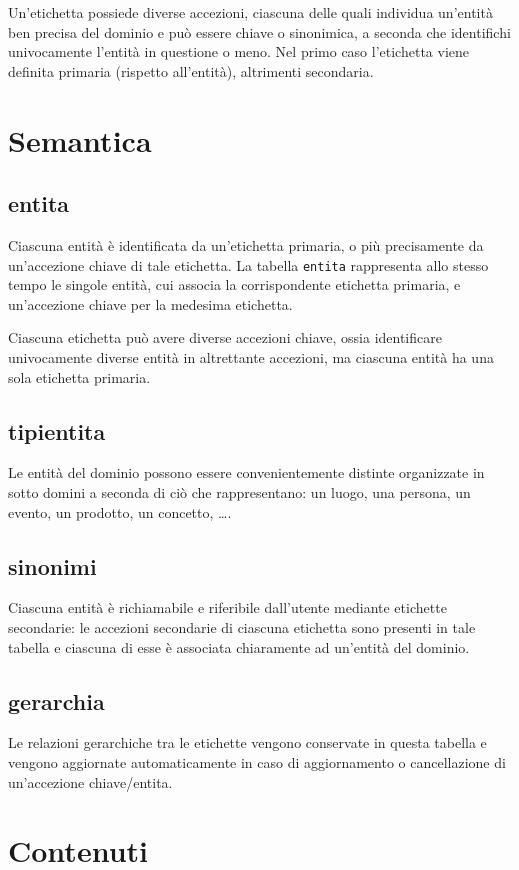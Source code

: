 \documentclass[10pt,a4paper,headinclude,footinclude,hidelinks]{scrreprt} %
\begin{document}
	Un'etichetta possiede diverse accezioni, ciascuna delle quali individua un'entità ben precisa del dominio e può essere chiave o sinonimica, a seconda che identifichi univocamente l'entità in questione o meno. Nel primo caso l'etichetta viene definita primaria (rispetto all'entità), altrimenti secondaria.
	
	\section{Semantica}
	\subsection{entita}
	Ciascuna entità è identificata da un'etichetta primaria, o più precisamente da un'accezione chiave di tale etichetta. La tabella \texttt{entita} rappresenta allo stesso tempo le singole entità, cui associa la corrispondente etichetta primaria, e un'accezione chiave per la medesima etichetta.

	Ciascuna etichetta può avere diverse accezioni chiave, ossia identificare univocamente diverse entità in altrettante accezioni, ma ciascuna entità ha una sola etichetta primaria.

	\subsection{tipi\textunderscore entita}
	Le entità del dominio possono essere convenientemente distinte organizzate in sotto domini a seconda di ciò che rappresentano: un luogo, una persona, un evento, un prodotto, un concetto, \ldots. 

	\subsection{sinonimi}
	Ciascuna entità è richiamabile e riferibile dall'utente mediante etichette secondarie: le accezioni secondarie di ciascuna etichetta sono presenti in tale tabella e ciascuna di esse è associata chiaramente ad un'entità del dominio.

	\subsection{gerarchia}
	Le relazioni gerarchiche tra le etichette vengono conservate in questa tabella e vengono aggiornate automaticamente in caso di aggiornamento o cancellazione di un'accezione chiave/entita.

	\section{Contenuti}
\end{document}

